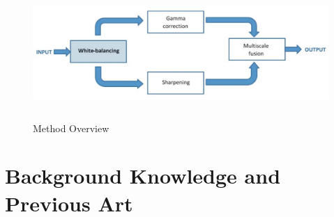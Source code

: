 \documentclass[hidelinks, 12pt]{report}
\begin{document}
\begin{figure}[H]
\centering
\includegraphics[width=15cm,height=5cm]{Block.png}
\caption[Method Overview]{Method Overview}
\label{Method Overview}
\end{figure}
\chapter{Background Knowledge and Previous Art}
\end{document}
